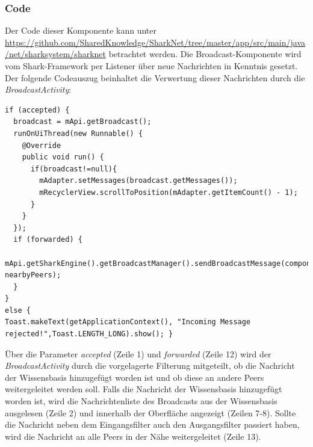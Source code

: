 \subsubsection{Code}
\begin{sloppypar}
Der Code dieser Komponente kann unter \url{https://github.com/SharedKnowledge/SharkNet/tree/master/app/src/main/java/net/sharksystem/sharknet} betrachtet werden.
Die Broadcast-Komponente wird vom Shark-Framework per Listener über neue Nachrichten in Kenntnis gesetzt. Der folgende Codeauszug beinhaltet die Verwertung dieser Nachrichten durch die \textit{BroadcastActivity}: \\
\end{sloppypar}
 \lstset{language=Java, caption=Anzeige und Weiterleitungen von Nachrichten (Auszug), label=DescriptiveLabel, numbers=left, numbersep=1em, breaklines=true, basicstyle=\small}
\begin{lstlisting}
if (accepted) {
  broadcast = mApi.getBroadcast();
  runOnUiThread(new Runnable() {
    @Override
    public void run() {
      if(broadcast!=null){
        mAdapter.setMessages(broadcast.getMessages());
        mRecyclerView.scrollToPosition(mAdapter.getItemCount() - 1);
      }
    }
  });
  if (forwarded) {
    mApi.getSharkEngine().getBroadcastManager().sendBroadcastMessage(component, nearbyPeers);
  }
}
else {
Toast.makeText(getApplicationContext(), "Incoming Message rejected!",Toast.LENGTH_LONG).show(); }
\end{lstlisting}
Über die Parameter \textit{accepted} (Zeile 1) und \textit{forwarded} (Zeile 12) wird der \textit{BroadcastActivity} durch die vorgelagerte Filterung mitgeteilt, ob die Nachricht der Wissensbasis hinzugefügt worden ist und ob diese an andere Peers weitergeleitet werden soll. Falls die Nachricht der Wissensbasis hinzugefügt worden ist, wird die Nachrichtenliste des Broadcasts aus der Wissensbasis ausgelesen (Zeile 2) und innerhalb der Oberfläche angezeigt (Zeilen 7-8). Sollte die Nachricht neben dem Eingangsfilter auch den Ausgangsfilter passiert haben, wird die Nachricht an alle Peers in der Nähe weitergeleitet (Zeile 13). 

